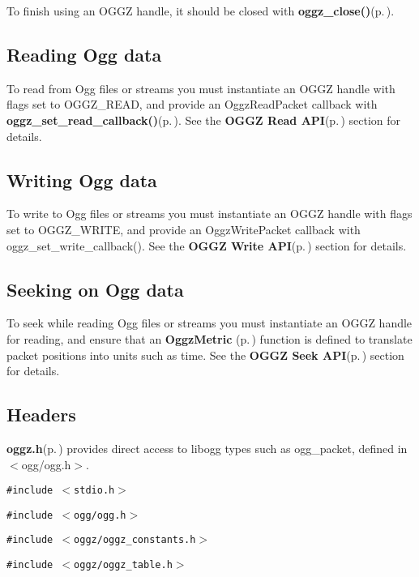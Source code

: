To finish using an OGGZ handle, it should be closed with {\bf oggz\_\-close()}{\rm (p.\,\pageref{oggz_8h_a8})}.\subsection{Reading Ogg data}\label{reading}
To read from Ogg files or streams you must instantiate an OGGZ handle with flags set to OGGZ\_\-READ, and provide an Oggz\-Read\-Packet callback with {\bf oggz\_\-set\_\-read\_\-callback()}{\rm (p.\,\pageref{group__read__api_a1})}. See the {\bf OGGZ Read API}{\rm (p.\,\pageref{group__read__api})} section for details.\subsection{Writing Ogg data}\label{writing}
To write to Ogg files or streams you must instantiate an OGGZ handle with flags set to OGGZ\_\-WRITE, and provide an Oggz\-Write\-Packet callback with oggz\_\-set\_\-write\_\-callback(). See the {\bf OGGZ Write API}{\rm (p.\,\pageref{group__write__api})} section for details.\subsection{Seeking on Ogg data}\label{seeking}
To seek while reading Ogg files or streams you must instantiate an OGGZ handle for reading, and ensure that an {\bf Oggz\-Metric }{\rm (p.\,\pageref{group__metric})} function is defined to translate packet positions into units such as time. See the {\bf OGGZ Seek API}{\rm (p.\,\pageref{group__seek__api})} section for details.\subsection{Headers}\label{headers}
{\bf oggz.h}{\rm (p.\,\pageref{oggz_8h})} provides direct access to libogg types such as ogg\_\-packet, defined in $<$ogg/ogg.h$>$.

{\tt \#include $<$stdio.h$>$}\par
{\tt \#include $<$ogg/ogg.h$>$}\par
{\tt \#include $<$oggz/oggz\_\-constants.h$>$}\par
{\tt \#include $<$oggz/oggz\_\-table.h$>$}\par
